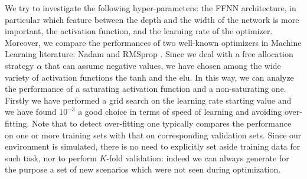 \documentclass[runningheads]{m2ef}
\begin{document}
	We try to investigate the following hyper-parameters: the FFNN architecture, in particular which feature between the depth and the width of the network is more important, the activation function, and the learning rate of the optimizer. Moreover, we compare the performances of two well-known optimizers in Machine Learning literature: Nadam \cite{Dozat2016} and RMSprop \cite{Hiton2012}. Since we deal with a free allocation strategy $\alpha$ that can assume negative values, we have chosen among the wide variety of activation functions\cite{Goodfellow2016} the tanh and the elu. In this way, we can analyze the performance of a saturating activation function and a non-saturating one. Firstly we have performed a grid search on the learning rate starting value and we have found $10^{-3}$ a good choice in terms of speed of learning and avoiding over-fitting. Note that to detect over-fitting one typically compares the performance on one or more training sets with that on corresponding validation sets. Since our environment is simulated, there is no need to explicitly set aside training data for such task, nor to perform $K$-fold validation: indeed we can always generate for the purpose a set of new scenarios which were not seen during optimization.
\end{document}
